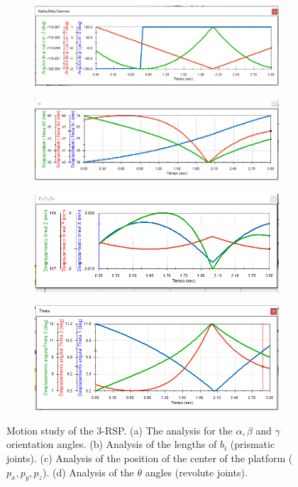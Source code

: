 \documentclass[titlepage, letterpaper]{article}
\begin{document}
\begin{figure}[htbp]
    \centering
    \begin{subfigure}[b]{0.65\textwidth}
        \includegraphics[width=\linewidth]{AlphaBetaGamma_sw}
        \caption{}
    \end{subfigure}
    \begin{subfigure}[b]{0.65\textwidth}
        \includegraphics[width=\linewidth]{bi_sw}
        \caption{}
    \end{subfigure}
    \begin{subfigure}[b]{0.65\textwidth}
        \includegraphics[width=\linewidth]{PxPyPz_sw}
        \caption{}
    \end{subfigure}
    \begin{subfigure}[b]{0.65\textwidth}
        \includegraphics[width=\linewidth]{Theta_sw}
        \caption{}
    \end{subfigure}
    \caption{Motion study of the 3-RSP.
    (a) The analysis for the $\alpha, \beta$ and $\gamma$ orientation angles.
    (b) Analysis of the lengths of $b_i$ (prismatic joints).
    (c) Analysis of the position of the center of the platform ($p_x, p_y, p_z$).
    (d) Analysis of the $\theta$ angles (revolute joints).}
    \label{fig:motion}
\end{figure}
\end{document}
